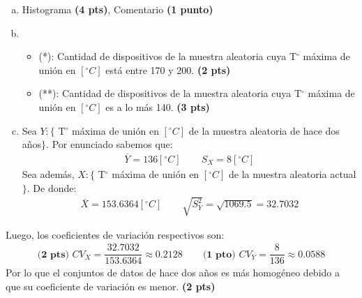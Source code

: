 \begin{solution}
\begin{enumerate}[a)]
\item Histograma \textbf{(4 pts)}, Comentario \textbf{(1 punto)}
\item 
\begin{itemize}
\item (*): Cantidad de dispositivos de la muestra aleatoria cuya T$^\circ$ máxima de unión en $[^\circ C]$ está entre 170 y 200. \textbf{(2 pts)}
\item (**):  Cantidad de dispositivos de la muestra aleatoria cuya T$^\circ$ máxima de unión en $[^\circ C]$ es a lo más 140. \textbf{(3 pts)}
\end{itemize} 
\item Sea $Y:\{$ T$^\circ$ máxima de unión en $[^\circ C]$ de la muestra aleatoria de hace dos años$\}$. Por enunciado sabemos que:
\begin{align*}
\overline{Y}=136 [^\circ C]\hspace{25pt} S_X=8 [^\circ C]
\end{align*}
Sea además, $X:\{$ T$^\circ$ máxima de unión en $[^\circ C]$ de la muestra aleatoria actual $\}$. De donde:
\begin{align*}
\overline{X}=  153.6364 [^\circ C]\hspace{25pt} \sqrt{S_{Y}^2}=\sqrt{1069.5}=32.7032
\end{align*}
\end{enumerate}
Luego, los coeficientes de variación respectivos son:
\begin{align*}
\textbf{(2 pts) } CV_X=\dfrac{32.7032}{153.6364}\approx 0.2128 \hspace{25pt} \textbf{(1 pto) } CV_Y=\dfrac{8}{136}\approx 0.0588
\end{align*}
Por lo que el conjuntos de datos de hace dos años es más homogéneo debido a que su coeficiente de variación es menor. \textbf{(2 pts)}
\end{solution}